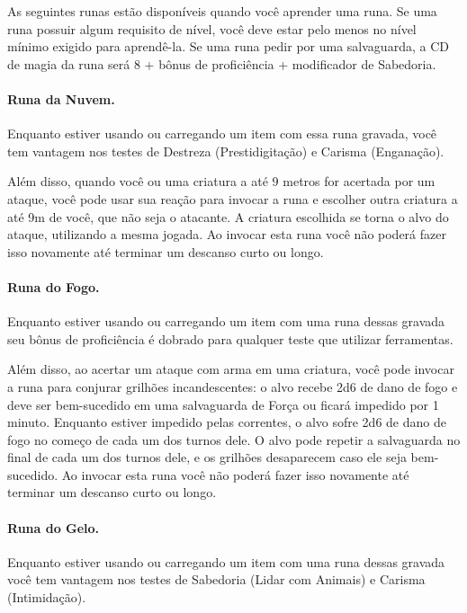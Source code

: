 \begin{multicols}{2}
As seguintes runas estão disponíveis quando você aprender uma runa. Se uma runa
possuir algum requisito de nível, você deve estar pelo menos no nível mínimo
exigido para aprendê-la. Se uma runa pedir por uma salvaguarda, a CD de magia da
runa será 8 + bônus de proficiência + modificador de Sabedoria.

\paragraph{Runa da Nuvem.}%

Enquanto estiver usando ou carregando um item com essa runa gravada, você tem
vantagem nos testes de Destreza (Prestidigitação) e Carisma (Enganação).

Além disso, quando você ou uma criatura a até 9 metros for acertada por um
ataque, você pode usar sua reação para invocar a runa e escolher outra criatura
a até 9m de você, que não seja o atacante. A criatura escolhida se torna o alvo
do ataque, utilizando a mesma jogada. Ao invocar esta runa você não poderá fazer
isso novamente até terminar um descanso curto ou longo.

\paragraph{Runa do Fogo.}%

Enquanto estiver usando ou carregando um item com uma runa dessas gravada seu
bônus de proficiência é dobrado para qualquer teste que utilizar ferramentas.

Além disso, ao acertar um ataque com arma em uma criatura, você pode invocar a
runa para conjurar grilhões incandescentes: o alvo recebe 2d6 de dano de fogo e
deve ser bem-sucedido em uma salvaguarda de Força ou ficará impedido por 1
minuto. Enquanto estiver impedido pelas correntes, o alvo sofre 2d6 de dano de
fogo no começo de cada um dos turnos dele. O alvo pode repetir a salvaguarda no
final de cada um dos turnos dele, e os grilhões desaparecem caso ele seja
bem-sucedido. Ao invocar esta runa você não poderá fazer isso novamente até
terminar um descanso curto ou longo.

\paragraph{Runa do Gelo.}%

Enquanto estiver usando ou carregando um item com uma runa dessas gravada você
tem vantagem nos testes de Sabedoria (Lidar com Animais) e Carisma
(Intimidação).


\end{multicols}
